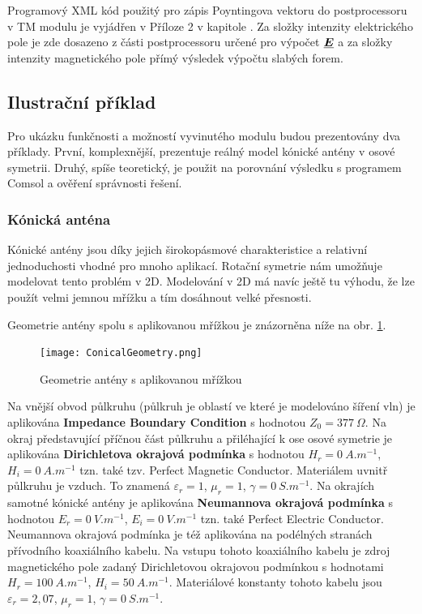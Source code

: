 \documentclass[12pt,a4paper,oneside]{article}
\numberwithin{equation}{section} %
\numberwithin{figure}{section} %
\numberwithin{table}{section} %
\renewcommand{\vec}[1]{\mbox{\boldmath$#1$}} %
\newcommand{\faz}[1]{{\underline{#1}}} %
\begin{document}
Programový XML kód použitý pro zápis Poyntingova vektoru do postprocessoru v TM modulu je vyjádřen v Příloze 2 v kapitole . Za složky intenzity elektrického pole je zde dosazeno z části postprocessoru určené pro výpočet $\faz{\vec{E}}$ a za složky intenzity magnetického pole přímý výsledek výpočtu slabých forem.



\subsection{Ilustrační příklad}
Pro ukázku funkčnosti a možností vyvinutého modulu budou prezentovány dva příklady. První, komplexnější, prezentuje reálný model kónické antény v osové symetrii. Druhý, spíše teoretický, je použit na porovnání výsledku s programem Comsol a ověření správnosti řešení.

\subsubsection{Kónická anténa}
Kónické antény jsou díky jejich širokopásmové charakteristice a relativní jednoduchosti vhodné pro mnoho aplikací. Rotační symetrie nám umožňuje modelovat tento problém v 2D. Modelování v 2D má navíc ještě tu výhodu, že lze použít velmi jemnou mřížku a tím dosáhnout velké přesnosti.

Geometrie antény spolu s aplikovanou mřížkou je znázorněna níže na obr. \ref{meshed}. 

\begin{figure}
\begin{center}
\texttt{[image: ConicalGeometry.png]} 
\caption{Geometrie antény s aplikovanou mřížkou} 
\label{meshed}
\end{center}
\end{figure}

Na vnější obvod půlkruhu (půlkruh je oblastí ve které je modelováno šíření vln) je aplikována \textbf{Impedance Boundary Condition} s hodnotou $Z_0 = 377 ~ \Omega$. Na okraj představující příčnou část půlkruhu a přiléhající k ose osové symetrie je aplikována \textbf{Dirichletova okrajová podmínka} s hodnotou $H_r = 0 ~ A.m^{-1}$, $H_i = 0 ~ A.m^{-1}$ tzn. také tzv. Perfect Magnetic Conductor. Materiálem uvnitř půlkruhu je vzduch. To znamená $\varepsilon _r = 1$, $\mu _r = 1$, $\gamma = 0 ~ S.m^{-1}$. Na okrajích samotné kónické antény je aplikována \textbf{Neumannova okrajová podmínka} s hodnotou $E_r = 0 ~ V.m^{-1}$, $E_i = 0 ~ V.m^{-1}$ tzn. také Perfect Electric Conductor. Neumannova okrajová podmínka je též aplikována na podélných stranách přívodního koaxiálního kabelu. Na vstupu tohoto koaxiálního kabelu je zdroj magnetického pole zadaný Dirichletovou okrajovou podmínkou s hodnotami $H_r = 100 ~ A.m^{-1}$, $H_i = 50 ~ A.m^{-1}$. Materiálové konstanty tohoto kabelu jsou $\varepsilon _r = 2,07$, $\mu _r = 1$, $\gamma = 0 ~ S.m^{-1}$.
\end{document}

